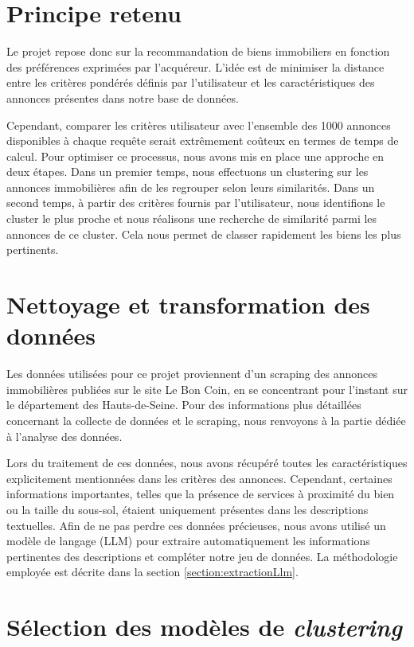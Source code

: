 \documentclass[a4paper, 12pt, twoside]{report}
\begin{document}
	\section{Principe retenu}
	
	Le projet repose donc sur la recommandation de biens immobiliers en fonction des préférences exprimées par l’acquéreur. L'idée est de minimiser la distance entre les critères pondérés définis par l'utilisateur et les caractéristiques des annonces présentes dans notre base de données.

	Cependant, comparer les critères utilisateur avec l’ensemble des 1000 annonces disponibles à chaque requête serait extrêmement coûteux en termes de temps de calcul. Pour optimiser ce processus, nous avons mis en place une approche en deux étapes. Dans un premier temps, nous effectuons un clustering sur les annonces immobilières afin de les regrouper selon leurs similarités. Dans un second temps, à partir des critères fournis par l'utilisateur, nous identifions le cluster le plus proche et nous réalisons une recherche de similarité parmi les annonces de ce cluster. Cela nous permet de classer rapidement les biens les plus pertinents.

	\section{Nettoyage et transformation des données}
	
	Les données utilisées pour ce projet proviennent d’un scraping des annonces immobilières publiées sur le site Le Bon Coin, en se concentrant pour l’instant sur le département des Hauts-de-Seine. Pour des informations plus détaillées concernant la collecte de données et le scraping, nous renvoyons à la partie dédiée à l’analyse des données.

	Lors du traitement de ces données, nous avons récupéré toutes les caractéristiques explicitement mentionnées dans les critères des annonces. Cependant, certaines informations importantes, telles que la présence de services à proximité du bien ou la taille du sous-sol, étaient uniquement présentes dans les descriptions textuelles.  Afin de ne pas perdre ces données précieuses, nous avons utilisé un modèle de langage (LLM) pour extraire automatiquement les informations pertinentes des descriptions et compléter notre jeu de données.
 La méthodologie employée est décrite dans la section \ref{section:extractionLlm}.
	
	\section{Sélection des modèles de \textit{clustering}}
\end{document}
